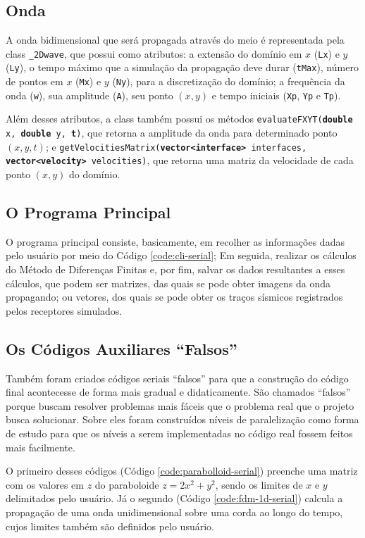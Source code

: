 \subsection{Onda}
A onda bidimensional que será propagada através do meio é representada pela \gls{class} \texttt{\_2Dwave}, que possui como 
atributos: a extensão do domínio em $x$ (\texttt{Lx}) e $y$ (\texttt{Ly}), o tempo máximo que a simulação 
da propagação deve durar (\texttt{tMax}), número de pontos em $x$ (\texttt{Mx}) e $y$ (\texttt{Ny}), para 
a discretização do domínio; a frequência da onda (\texttt{w}), sua amplitude (\texttt{A}), seu ponto $(x, y)$ e tempo iniciais
(\texttt{Xp}, \texttt{Yp} e \texttt{Tp}).

Além desses atributos, a \gls{class} também possui os métodos 
\texttt{evaluateFXYT(\textbf{double} x, \textbf{double} y, \textbf{t})}, que retorna a amplitude da onda para determinado ponto 
$(x, y, t)$; e \texttt{getVelocitiesMatrix(\textbf{vector<interface>} interfaces, \textbf{vector<velocity>} velocities)}, 
que retorna uma matriz da velocidade de cada ponto $(x, y)$ do domínio.

\subsection{O Programa Principal}
O programa principal consiste, basicamente, em recolher as informações dadas pelo usuário por meio do Código 
\ref{code:cli-serial}; Em seguida, realizar os cálculos do Método de Diferenças Finitas e, por fim, salvar 
os dados resultantes a esses cálculos, que podem ser matrizes, das quais se pode obter imagens da onda propagando; ou vetores, dos 
quais se pode obter os traços sísmicos registrados pelos receptores simulados.

\subsection{Os Códigos Auxiliares ``Falsos''}
Também foram criados códigos seriais ``falsos'' para que a construção do código final acontecesse de forma mais gradual e didaticamente. 
São chamados ``falsos'' porque buscam resolver problemas mais fáceis que o problema real que o projeto busca solucionar. Sobre 
eles foram construídos níveis de paralelização como forma de estudo para que os níveis a serem implementadas no código real 
fossem feitos mais facilmente.

O primeiro desses códigos (Código \ref{code:parabolloid-serial}) preenche uma matriz com os valores em $z$ do paraboloide $z = 2x^2 + y^2$, 
sendo os limites de $x$ e $y$ delimitados pelo usuário. Já o segundo (Código \ref{code:fdm-1d-serial}) calcula a propagação de uma onda 
unidimensional sobre uma corda ao longo do tempo, cujos limites também são definidos pelo usuário.

